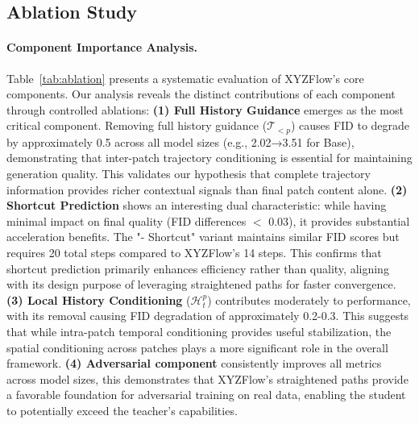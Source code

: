 \documentclass{article}
\theoremstyle{plain}
\theoremstyle{definition}
\theoremstyle{remark}
\begin{document}





\vspace{-2mm}
\subsection{Ablation Study}
\label{subsec:ablation_study}

\vspace{-2mm}
\paragraph{Component Importance Analysis.}
Table~\ref{tab:ablation} presents a systematic evaluation of XYZFlow's core components. Our analysis reveals the distinct contributions of each component through controlled ablations: \textbf{(1) Full History Guidance} emerges as the most critical component. Removing full history guidance ($\mathcal{T}_{<p}$) causes FID to degrade by approximately 0.5 across all model sizes (e.g., 2.02→3.51 for Base), demonstrating that inter-patch trajectory conditioning is essential for maintaining generation quality. This validates our hypothesis that complete trajectory information provides richer contextual signals than final patch content alone. \textbf{(2) Shortcut Prediction} shows an interesting dual characteristic: while having minimal impact on final quality (FID differences $<$ 0.03), it provides substantial acceleration benefits. The "- Shortcut" variant maintains similar FID scores but requires 20 total steps compared to XYZFlow's 14 steps. This confirms that shortcut prediction primarily enhances efficiency rather than quality, aligning with its design purpose of leveraging straightened paths for faster convergence. \textbf{(3) Local History Conditioning} ($\mathcal{H}_{t}^p$) contributes moderately to performance, with its removal causing FID degradation of approximately 0.2-0.3. This suggests that while intra-patch temporal conditioning provides useful stabilization, the spatial conditioning across patches plays a more significant role in the overall framework. \textbf{(4) Adversarial component} consistently improves all metrics across model sizes, this demonstrates that XYZFlow's straightened paths provide a favorable foundation for adversarial training on real data, enabling the student to potentially exceed the teacher's capabilities.
\end{document}
